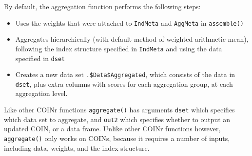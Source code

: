 \documentclass[
]{book}
\newenvironment{Shaded}{\begin{snugshade}}{\end{snugshade}}
\newcommand{\CommentTok}[1]{\textcolor[rgb]{0.56,0.35,0.01}{\textit{#1}}}
\newcommand{\DecValTok}[1]{\textcolor[rgb]{0.00,0.00,0.81}{#1}}
\newcommand{\KeywordTok}[1]{\textcolor[rgb]{0.13,0.29,0.53}{\textbf{#1}}}
\newcommand{\NormalTok}[1]{#1}
\newcommand{\OperatorTok}[1]{\textcolor[rgb]{0.81,0.36,0.00}{\textbf{#1}}}
\newcommand{\StringTok}[1]{\textcolor[rgb]{0.31,0.60,0.02}{#1}}
\providecommand{\tightlist}{%
  \setlength{\itemsep}{0pt}\setlength{\parskip}{0pt}}
\begin{document}
\begin{Shaded}
\end{Shaded}

By default, the aggregation function performs the following steps:

\begin{itemize}
\tightlist
\item
  Uses the weights that were attached to \texttt{IndMeta} and \texttt{AggMeta} in \texttt{assemble()}
\item
  Aggregates hierarchically (with default method of weighted arithmetic mean), following the index structure specified in \texttt{IndMeta} and using the data specified in \texttt{dset}
\item
  Creates a new data set \texttt{.\$Data\$Aggregated}, which consists of the data in \texttt{dset}, plus extra columns with scores for each aggregation group, at each aggregation level.
\end{itemize}

Like other COINr functions \texttt{aggregate()} has arguments \texttt{dset} which specifies which data set to aggregate, and \texttt{out2} which specifies whether to output an updated COIN, or a data frame. Unlike other COINr functions however, \texttt{aggregate()} only works on COINs, because it requires a number of inputs, including data, weights, and the index structure.
\end{document}

